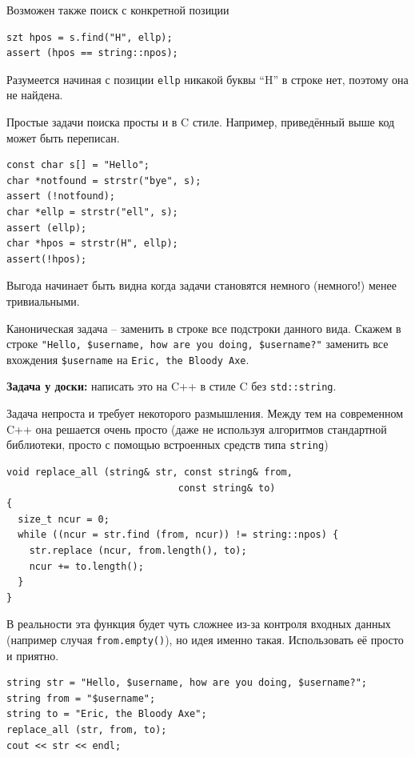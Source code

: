 \documentclass[a4paper,12pt,oneside]{book}
\begin{document}
Возможен также поиск с конкретной позиции

\begin{lstlisting}
szt hpos = s.find("H", ellp); 
assert (hpos == string::npos);
\end{lstlisting}

Разумеется начиная с позиции \lstinline!ellp! никакой буквы ``H'' в строке нет, поэтому она не найдена.

Простые задачи поиска просты и в C стиле. Например, приведённый выше код может быть переписан.

\begin{lstlisting}
const char s[] = "Hello";
char *notfound = strstr("bye", s);
assert (!notfound);
char *ellp = strstr("ell", s);
assert (ellp);
char *hpos = strstr(H", ellp);
assert(!hpos); 
\end{lstlisting}

Выгода начинает быть видна когда задачи становятся немного (немного!) менее тривиальными.

Каноническая задача -- заменить в строке все подстроки данного вида. Скажем в строке \lstinline!"Hello, $username, how are you doing, $username?"! заменить все вхождения \lstinline!$username! на \lstinline!Eric, the Bloody Axe!.

\textbf{Задача у доски:} написать это на C++ в стиле C без \lstinline!std::string!.

Задача непроста и требует некоторого размышления. Между тем на современном C++ она решается очень просто (даже не используя алгоритмов стандартной библиотеки, просто с помощью встроенных средств типа \lstinline!string!)

\begin{lstlisting}
void replace_all (string& str, const string& from, 
                              const string& to) 
{
  size_t ncur = 0;
  while ((ncur = str.find (from, ncur)) != string::npos) {
    str.replace (ncur, from.length(), to);
    ncur += to.length(); 
  }
}
\end{lstlisting}

В реальности эта функция будет чуть сложнее из-за контроля входных данных (например случая \lstinline!from.empty()!), но идея именно такая. Использовать её просто и приятно.

\begin{lstlisting}
string str = "Hello, $username, how are you doing, $username?";
string from = "$username";
string to = "Eric, the Bloody Axe";
replace_all (str, from, to);
cout << str << endl;
\end{lstlisting}
\end{document}
